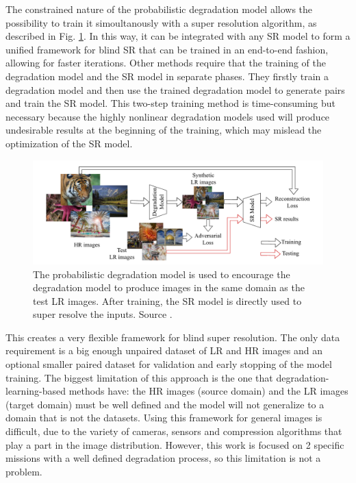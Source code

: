     
    The constrained nature of the probabilistic degradation model allows the possibility to train it simoultanously with a super resolution algorithm, as described in Fig. \ref{fig:3-GAN-degradation-model}.      
    In this way, it can be integrated with any SR model to form a unified framework for blind SR that can be trained in an end-to-end fashion, allowing for faster iterations.
    Other methods \cite{fritsche2019frequency} \cite{wei2020unsupervised} require that the training of the degradation model and the SR model in separate phases. They firstly train a degradation model and then use the trained degradation model to generate pairs and train the SR model.
    This two-step training method is time-consuming but necessary because the highly nonlinear degradation models used will produce undesirable results at the beginning of the training, which may mislead the optimization of the SR model.

    \begin{figure}[H]
        \centering
        \includegraphics[width=\textwidth]{Includes/3-GAN-degradation-model.png}
        \caption{The probabilistic degradation model is used to encourage the degradation model to produce images in the same domain as the test LR images.
                After training, the SR model is directly used to super resolve the inputs.
                Source \cite{luo2022learning}.}
        \label{fig:3-GAN-degradation-model}
    \end{figure}

    This creates a very flexible framework for blind super resolution. 
    The only data requirement is a big enough unpaired dataset of LR and HR images and an optional smaller paired dataset for validation and early stopping of the model training.
    The biggest limitation of this approach is the one that degradation-learning-based methods have: the HR images (source domain) and the LR images (target domain) must be well defined and the model will not generalize to a domain that is not the datasets. 
    Using this framework for general images is difficult, due to the variety of cameras, sensors and compression algorithms that play a part in the image distribution. However, this work is focused on 2 specific missions with a well defined degradation process, so this limitation is not a problem.


